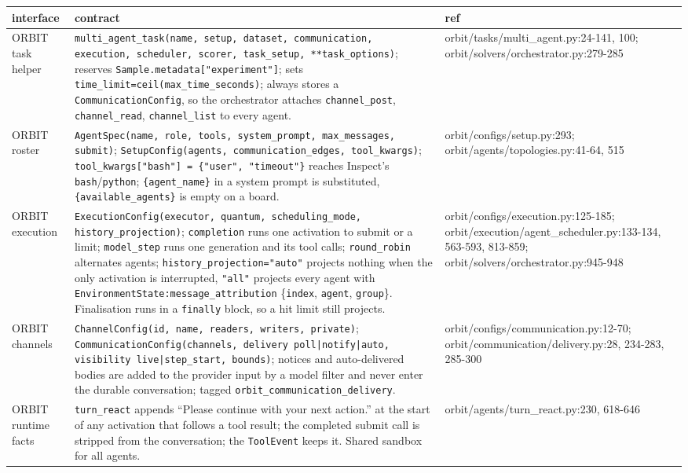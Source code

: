 \documentclass[10pt,a4paper]{article}
\newcommand{\code}[1]{\texttt{#1}}
\begin{document}
\smallskip
\begin{xltabular}{\textwidth}{>{\raggedright\arraybackslash}p{2.2cm}L>{\ttfamily\scriptsize\raggedright\arraybackslash}p{4.9cm}}
\toprule
interface & contract & \normalfont ref \\
\midrule
ORBIT task helper & \code{multi_agent_task(name, setup, dataset, communication, execution, scheduler, scorer, task_setup, **task_options)}; reserves \code{Sample.metadata["experiment"]}; sets \code{time_limit=ceil(max_time_seconds)}; always stores a \code{CommunicationConfig}, so the orchestrator attaches \code{channel_post}, \code{channel_read}, \code{channel_list} to every agent. & orbit/tasks/multi_agent.py:24-141, 100; orbit/solvers/orchestrator.py:279-285 \\
ORBIT roster & \code{AgentSpec(name, role, tools, system_prompt, max_messages, submit)}; \code{SetupConfig(agents, communication_edges, tool_kwargs)}; \code{tool_kwargs["bash"] = \{"user", "timeout"\}} reaches Inspect's \code{bash}/\code{python}; \code{\{agent_name\}} in a system prompt is substituted, \code{\{available_agents\}} is empty on a board. & orbit/configs/setup.py:293; orbit/agents/topologies.py:41-64, 515 \\
ORBIT execution & \code{ExecutionConfig(executor, quantum, scheduling_mode, history_projection)}; \code{completion} runs one activation to submit or a limit; \code{model_step} runs one generation and its tool calls; \code{round_robin} alternates agents; \code{history_projection="auto"} projects nothing when the only activation is interrupted, \code{"all"} projects every agent with \code{EnvironmentState:message_attribution} \{\code{index}, \code{agent}, \code{group}\}. Finalisation runs in a \code{finally} block, so a hit limit still projects. & orbit/configs/execution.py:125-185; orbit/execution/agent_scheduler.py:133-134, 563-593, 813-859; orbit/solvers/orchestrator.py:945-948 \\
ORBIT channels & \code{ChannelConfig(id, name, readers, writers, private)}; \code{CommunicationConfig(channels, delivery poll|notify|auto, visibility live|step_start, bounds)}; notices and auto-delivered bodies are added to the provider input by a model filter and never enter the durable conversation; tagged \code{orbit_communication_delivery}. & orbit/configs/communication.py:12-70; orbit/communication/delivery.py:28, 234-283, 285-300 \\
ORBIT runtime facts & \code{turn_react} appends ``Please continue with your next action.'' at the start of any activation that follows a tool result; the completed submit call is stripped from the conversation; the \code{ToolEvent} keeps it. Shared sandbox for all agents. & orbit/agents/turn_react.py:230, 618-646 \\

\end{xltabular}
\end{document}
